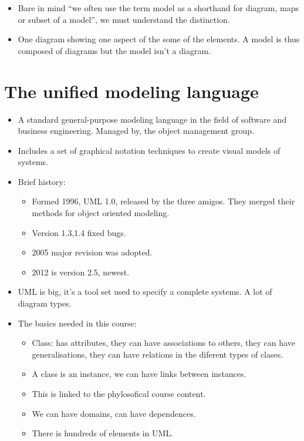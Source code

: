 \begin{itemize}
    \item Bare in mind ``we often use the term model as a shorthand for diagram, maps or subset of a model'', we must understand the distinction.
    \item One diagram showing one aspect of the some of the elements. A model is thus composed of diagrams but the model isn't a diagram.
\end{itemize}


\section{The unified modeling language}
\begin{itemize}
    \item A standard general-purpose modeling language in the field of software and business engineering. Managed by, the object management group.
    \item Includes a set of graphical notation techniques to create visual models of systems.
    \item Brief history:
        \begin{itemize}
            \item Formed 1996, UML 1.0, released by the three amigos. They merged their methods for object oriented modeling.
            \item Version 1.3,1.4 fixed bugs. 
            \item 2005 major revision was adopted.
            \item 2012 is version 2.5, newest.
        \end{itemize}
    
    \item UML is big, it's a tool set used to specify a complete systems. A lot of diagram types. 
    \item The basics needed in this course: 
        \begin{itemize}
            \item Class: has attributes, they can have associations to others, they can have generalisations, they can have relations in the diferent types of clases.
            \item A class is an instance, we can have links between instances. 
            \item This is linked to the phylosofical course content. 
            \item We can have domains, can have dependences. 
            \item There is hundreds of elements in UML.
        \end{itemize}
\end{itemize}


